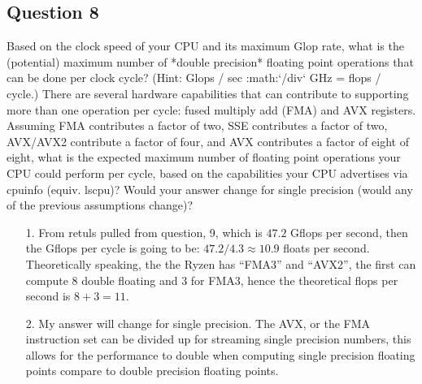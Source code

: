 \documentclass[]{article}
\begin{document}
\subsection*{Question 8}
    Based on the clock speed of your CPU and its maximum Glop rate, what is the (potential) maximum number of *double precision* floating point operations that can be done per clock cycle?  (Hint: Glops / sec :math:`/div` GHz = flops / cycle.)  There are several hardware capabilities that can contribute to supporting more than one operation per cycle: fused multiply add (FMA) and AVX registers.  Assuming FMA contributes a factor of two, SSE contributes a factor of two,  AVX/AVX2 contribute a factor of four, and AVX contributes a factor of eight of eight, what is the expected maximum number of floating point operations your CPU could perform per cycle, based on the capabilities your CPU advertises via cpuinfo (equiv. lscpu)?  Would your answer change for single precision (would any of the previous assumptions change)?  
    \\[1.1em]
    \begin{enumerate}
    \item[1.] From retuls pulled from question, 9, which is $47.2$ Gflops per second, then the Gflops per cycle is going to be: $47.2/4.3 \approx 10.9$ floats per second. 
    \\[1.1em]
    Theoretically speaking, the the Ryzen has ``FMA3'' and ``AVX2'', the first can compute $8$ double floating and $3$ for FMA3, hence the theoretical flops per second is $8 + 3 = 11$. 
    \item[2.] My answer will change for single precision. The AVX, or the FMA instruction set can be divided up for streaming single precision numbers, this allows for the performance to double when computing single precision floating points compare to double precision floating points.  
    \end{enumerate}
    
\end{document}
